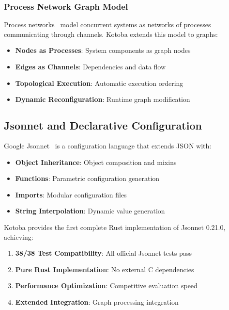 \documentclass[11pt,a4paper]{article}
\begin{document}
\subsubsection{Process Network Graph Model}
\label{subsubsec:process_network}

Process networks~\cite{kahn1974} model concurrent systems as networks of processes communicating through channels. Kotoba extends this model to graphs:

\begin{itemize}
\item \textbf{Nodes as Processes}: System components as graph nodes
\item \textbf{Edges as Channels}: Dependencies and data flow
\item \textbf{Topological Execution}: Automatic execution ordering
\item \textbf{Dynamic Reconfiguration}: Runtime graph modification
\end{itemize}

\subsection{Jsonnet and Declarative Configuration}
\label{subsec:jsonnet}

Google Jsonnet~\cite{jsonnet} is a configuration language that extends JSON with:
\begin{itemize}
\item \textbf{Object Inheritance}: Object composition and mixins
\item \textbf{Functions}: Parametric configuration generation
\item \textbf{Imports}: Modular configuration files
\item \textbf{String Interpolation}: Dynamic value generation
\end{itemize}

Kotoba provides the first complete Rust implementation of Jsonnet 0.21.0, achieving:
\begin{enumerate}
\item \textbf{38/38 Test Compatibility}: All official Jsonnet tests pass
\item \textbf{Pure Rust Implementation}: No external C dependencies
\item \textbf{Performance Optimization}: Competitive evaluation speed
\item \textbf{Extended Integration}: Graph processing integration
\end{enumerate}
\end{document}
